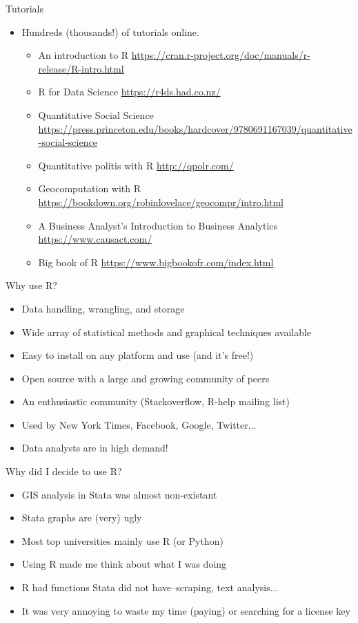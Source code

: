 \documentclass{beamer}
\begin{document}
\begin{frame}{Tutorials}
\begin{itemize}[<+->]
\item Hundreds (thousands!) of tutorials online.
\begin{itemize}
\item An introduction to R \url{https://cran.r-project.org/doc/manuals/r-release/R-intro.html}
\item R for Data Science \url{https://r4ds.had.co.nz/}
\item Quantitative Social Science \url{https://press.princeton.edu/books/hardcover/9780691167039/quantitative-social-science}
\item Quantitative politis with R \url{http://qpolr.com/}
\item Geocomputation with R \url{https://bookdown.org/robinlovelace/geocompr/intro.html}
\item A Business Analyst's Introduction to Business Analytics \url{https://www.causact.com/}
\item Big book of R  \url{https://www.bigbookofr.com/index.html}
\end{itemize}
 \end{itemize} 
\end{frame}


\begin{frame}{Why use R?}
\begin{itemize}[<+->]
\item Data handling, wrangling, and storage
\item Wide array of statistical methods and graphical techniques available
\item Easy to install on any platform and use (and it’s free!)
\item Open source with a large and growing community of peers
\item An enthusiastic community (Stackoverflow, R-help mailing list)
\item Used by New York Times, Facebook, Google, Twitter...
\item Data analysts are in high demand!
 \end{itemize} 
\end{frame}

\begin{frame}{Why did I decide to use R?}
\begin{itemize}[<+->]
\item GIS analysis in Stata was almost non-existant
\item Stata graphs are (very) ugly
\item Most top universities mainly use R (or Python)
\item Using R made me think about what I was doing
\item R had functions Stata did not have--scraping, text analysis...
\item It was very annoying to waste my time (paying) or searching for a license key
 \end{itemize} 
\end{frame}
\end{document}
